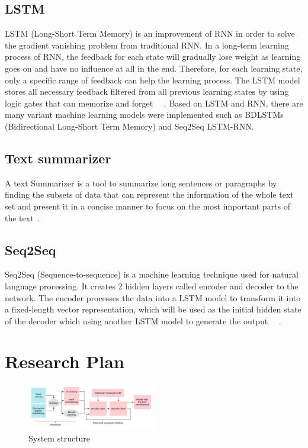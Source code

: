 \documentclass[conference]{IEEEtran}
\begin{document}
\subsection{LSTM}
LSTM (Long-Short Term Memory) is an improvement of RNN in order to solve the gradient vanishing problem from traditional RNN. In a long-term learning process of RNN, the feedback for each state will gradually lose weight as learning goes on and have no influence at all in the end. Therefore, for each learning state, only a specific range of feedback can help the learning process. The LSTM model stores all necessary feedback filtered from all previous learning states by using logic gates that can memorize and forget ~\cite{hochreiter1997long}~\cite{gers2000learning}. Based on LSTM and RNN, there are many variant machine learning models were implemented such as BDLSTMs (Bidirectional Long-Short Term Memory) and Seq2Seq LSTM-RNN. 
\subsection{Text summarizer}
A text Summarizer is a tool to summarize long sentences or paragraphs by finding the subsets of data that can represent the information of the whole text set and present it in a concise manner to focus on the most important parts of the text~\cite{sinha2018extractive}. 
\subsection{Seq2Seq}
Seq2Seq (Sequence-to-sequence) is a machine learning technique used for natural language processing. It creates 2 hidden layers called encoder and decoder to the network. The encoder processes the data into a LSTM model to transform it into a fixed-length vector representation, which will be used as the initial hidden state of the decoder which using another LSTM model to generate the output ~\cite{sutskever2014sequence}~\cite{vinyals2015show}. 

\section{Research Plan}
\begin{figure}[h]
\centering
\includegraphics[width=0.5\textwidth]{imgs/System_Structure.png}
\caption{System structure}
\label{fig:System_Structure}
\end{figure}
\end{document}
